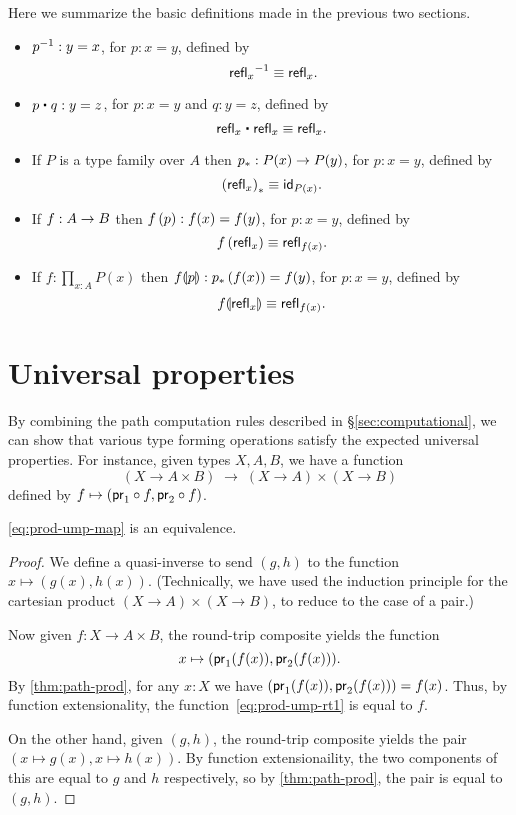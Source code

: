 Here we summarize the basic definitions made in the previous two sections.

\begin{itemize}
\item $\opp{p} : y=x$, for $p:x=y$, defined by
  \[\opp{\;\refl{x}}\jdeq \refl{x}.\]
\item $p\ct q :y=z$, for $p:x=y$ and $q:y=z$, defined by
  \[ \refl{x}\ct\refl{x}\jdeq\refl{x}.\]
\item If $P$ is a type family over $A$ then $\transf{p}:P(x)\ra P(y)$, for $p:x=y$, defined by
  \[\transf{(\refl{x})}\jdeq \idfunc[P(x)].\]
\item If $f:A\ra B$ then $\map{f}{p}:f(x)=f(y)$, for $p:x=y$, defined by
  \[\map{f}{\refl{x}}\jdeq \refl{f(x)}.\]
\item If $f:\prod_{x:A}P(x)$ then $\mapdep{f}{p}:\trans{p}{f(x)}=f(y)$, for $p:x=y$, defined by
  \[\mapdep{f}{\refl{x}}\jdeq \refl{f(x)}.\]
\end{itemize}







\section{Universal properties}
\label{sec:universal-properties}

By combining the path computation rules described in \S\ref{sec:computational}, we can show that various type forming operations satisfy the expected universal properties.
For instance, given types $X,A,B$, we have a function
\begin{equation}
  (X\to A\times B) \;\to \; (X\to A)\times (X\to B)\label{eq:prod-ump-map}
\end{equation}
defined by $f \mapsto (\proj1 \circ f, \proj2\circ f)$.

\begin{thm}\label{thm:prod-ump}
  \eqref{eq:prod-ump-map} is an equivalence.
\end{thm}
\begin{proof}
  We define a quasi-inverse to send $(g,h)$ to the function $x\mapsto (g(x),h(x))$.
  (Technically, we have used the induction principle for the cartesian product $(X\to A)\times (X\to B)$, to reduce to the case of a pair.)

  Now given $f:X\to A\times B$, the round-trip composite yields the function
  \begin{equation}
    x\mapsto (\proj1(f(x)),\proj2(f(x))).\label{eq:prod-ump-rt1}
  \end{equation}
  By \autoref{thm:path-prod}, for any $x:X$ we have $(\proj1(f(x)),\proj2(f(x))) = f(x)$.
  Thus, by function extensionality, the function~\eqref{eq:prod-ump-rt1} is equal to $f$.

  On the other hand, given $(g,h)$, the round-trip composite yields the pair $(x\mapsto g(x),x\mapsto h(x))$.
  By function extensionaility, the two components of this are equal to $g$ and $h$ respectively, so by \autoref{thm:path-prod}, the pair is equal to $(g,h)$.
\end{proof}

